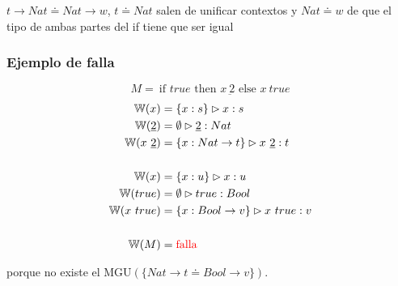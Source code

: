 \documentclass{report}
\theoremstyle{definition} %
\newcommand{\tfunc}[2]{#1 \to #2}
\newcommand{\ifte}[3]{\ \text{if } #1 \text{ then } #2 \text{ else } #3}
\newcommand{\app}[2]{#1 \ #2} %
\newcommand{\tipa}[3]{#1 \rhd #2 : #3} %
\newcommand{\num}[1]{\underbar{#1}} %
\newcommand{\changed}[1]{\textcolor{red}{#1}}
\newcommand{\infer}[1]{\mathbb{W}(#1)}
\newcommand{\tcontextOne}[2]{\{ #1 : #2 \}} %
\newcommand{\etipa}[2]{\tipa{\emptyset}{#1}{#2}} %
\newcommand{\unify}[2]{#1 \doteq #2}
\newcommand{\mgu}[2]{\text{MGU}(\{ \unify{#1}{#2} \})}
\begin{document}
\begin{itemize}
    $\unify{\tfunc{t}{Nat}}{\tfunc{Nat}{w}}$, $\unify{t}{Nat}$ salen de unificar
    contextos y $\unify{Nat}{w}$ de que el tipo de ambas partes del if tiene que
    ser igual
\end{itemize}

\subsubsection{Ejemplo de falla}

$$M = \ifte{true}{\app{x}{\num{2}}}{\app{x}{true}}$$
\begin{align*}
    \infer{x} &= \tipa{\tcontextOne{x}{s}}{x}{s}\\
    \infer{\num{2}} &= \etipa{\num{2}}{Nat}\\
    \infer{\app{x}{\num{2}}} &=
        \tipa
            {\tcontextOne{x}{\tfunc{Nat}{t}}}
            {\app{x}{\num{2}}}
            {t}\\
    \\
    \infer{x} &= \tipa{\tcontextOne{x}{u}}{x}{u}\\
    \infer{true} &= \etipa{true}{Bool}\\
    \infer{\app{x}{true}} &=
        \tipa
            {\tcontextOne{x}{\tfunc{Bool}{v}}}
            {\app{x}{true}}
            {v}\\
    \\
    \infer{M} &= \text{\changed{falla}}
\end{align*}

porque no existe el $\mgu{\tfunc{Nat}{t}}{\tfunc{Bool}{v}}$.
\end{document}
